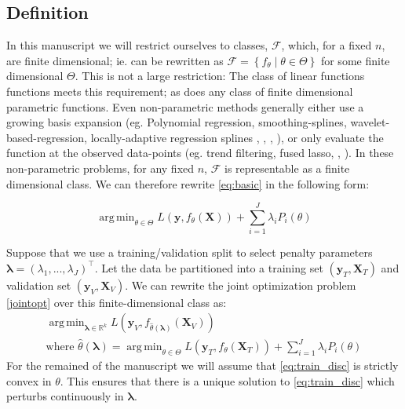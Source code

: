 \documentclass[10pt,letterpaper]{article}
\DeclareMathOperator*{\argmin}{arg\,min}
\begin{document}
\subsection{Definition}
In this manuscript we will restrict ourselves to classes, $\mathcal{F}$, which, for a fixed $n$, are finite dimensional; ie. can be rewritten as $\mathcal{F} = \left\{f_{\theta}\middle|\theta\in\Theta\right\}$ for some finite dimensional $\Theta$. This is not a large restriction: The class of linear functions functions meets this requirement; as does any class of finite dimensional parametric functions. Even non-parametric methods generally either use a growing basis expansion (eg. Polynomial regression, smoothing-splines, wavelet-based-regression, locally-adaptive regression splines \citep{tsybakov2008introduction}, \citep{wahba1981spline}, \citep{donoho1994ideal}, \citep{mammen1997locally}), or only evaluate the function at the observed data-points (eg. trend filtering, fused lasso, \citep{kim2009ell_1}, \citep{tibshirani2005sparsity}). In these non-parametric problems, for any fixed $n$, $\mathcal{F}$ is representable as a finite dimensional class.
We can therefore rewrite \eqref{eq:basic} in the following form:

\begin{equation}\label{eq:train_disc}
\argmin_{\theta \in \Theta} L(\boldsymbol{y}, f_\theta(\boldsymbol{X})) + \sum\limits_{i=1}^J \lambda_i P_i(\theta)
\end{equation}

Suppose that we use a training/validation split to select penalty parameters $\boldsymbol{\lambda} = (\lambda_1, ..., \lambda_J)^\top$. Let the data be partitioned into a training set $(\boldsymbol{y}_T , \boldsymbol{X}_T)$ and validation set $(\boldsymbol{y}_V, \boldsymbol{X}_V)$. We can rewrite the joint optimization problem \eqref{jointopt} over this finite-dimensional class as:
\begin{equation}
\begin{array}{c}
\argmin_{\boldsymbol{\lambda} \in \mathbb{R}^k} L(\boldsymbol{y}_V, f_{\hat{\theta}(\boldsymbol{\lambda})}(\boldsymbol{X}_V)) \\
\text{where } {\hat{\theta}(\boldsymbol{\lambda})} = \argmin_{\theta \in \Theta} L(\boldsymbol{y}_T, f_\theta (\boldsymbol{X}_T)) + \sum\limits_{i=1}^J \lambda_i P_i(\theta)
\end{array}
\label{jointopt2}
\end{equation}
For the remained of the manuscript we will assume that \eqref{eq:train_disc} is strictly convex in $\theta$. This ensures that there is a unique solution to \eqref{eq:train_disc} which perturbs continuously in $\boldsymbol{\lambda}$.
\end{document}
